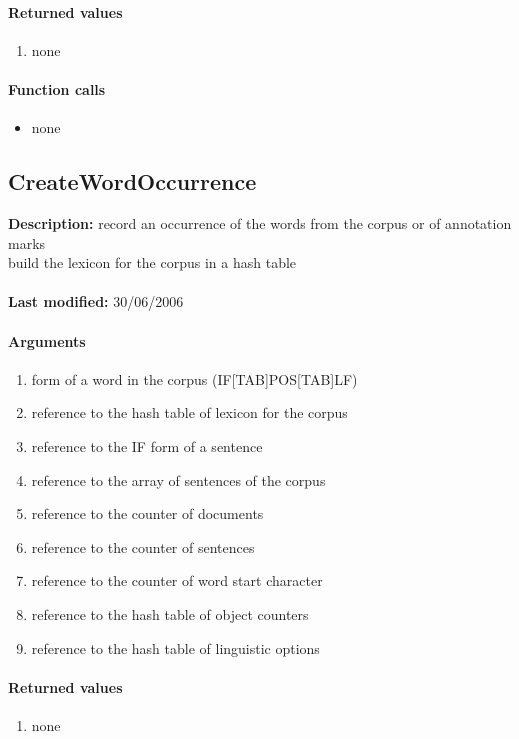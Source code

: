 \paragraph{Returned values}
\begin{enumerate}
\item none
\end{enumerate}

\paragraph{Function calls}
\begin{itemize}
\item none
\end{itemize}

\subsection{CreateWordOccurrence}
\textbf{Description:} record an occurrence of the words from the corpus or of annotation marks\\
build the lexicon for the corpus in a hash table\\
\\\textbf{Last modified:} 30/06/2006

\paragraph{Arguments}
\begin{enumerate}
\item form of a word in the corpus (IF[TAB]POS[TAB]LF)
\item reference to the hash table of lexicon for the corpus
\item reference to the IF form of a sentence
\item reference to the array of sentences of the corpus
\item reference to the counter of documents
\item reference to the counter of sentences
\item reference to the counter of word start character
\item reference to the hash table of object counters
\item reference to the hash table of linguistic options
\end{enumerate}

\paragraph{Returned values}
\begin{enumerate}
\item none
\end{enumerate}


